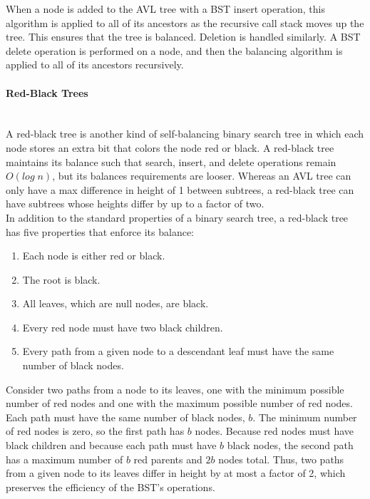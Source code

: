 When a node is added to the AVL tree with a BST insert operation, this algorithm is applied to all of its ancestors as the recursive call stack moves up the tree. This ensures that the tree is balanced. Deletion is handled similarly. A BST delete operation is performed on a node, and then the balancing algorithm is applied to all of its ancestors recursively. \\

\paragraph{Red-Black Trees} \hspace*{1mm} \vspace*{2mm} \\

A red-black tree is another kind of self-balancing binary search tree in which each node stores an extra bit that colors the node red or black. A red-black tree maintains its balance such that search, insert, and delete operations remain $O(log\;n)$, but its balances requirements are looser. Whereas an AVL tree can only have a max difference in height of 1 between subtrees, a red-black tree can have subtrees whose heights differ by up to a factor of two. \\

In addition to the standard properties of a binary search tree, a red-black tree has five properties that enforce its balance:

\begin{enumerate}
	\item Each node is either red or black.
	\item The root is black.
	\item All leaves, which are null nodes, are black.
	\item Every red node must have two black children.
	\item Every path from a given node to a descendant leaf must have the same number of black nodes.
\end{enumerate}

Consider two paths from a node to its leaves, one with the minimum possible number of red nodes and one with the maximum possible number of red nodes. Each path must have the same number of black nodes, $b$. The minimum number of red nodes is zero, so the first path has $b$ nodes. Because red nodes must have black children and because each path must have $b$ black nodes, the second path has a maximum number of $b$ red parents and $2b$ nodes total. Thus, two paths from a given node to its leaves differ in height by at most a factor of 2, which preserves the efficiency of the BST's operations. \\

